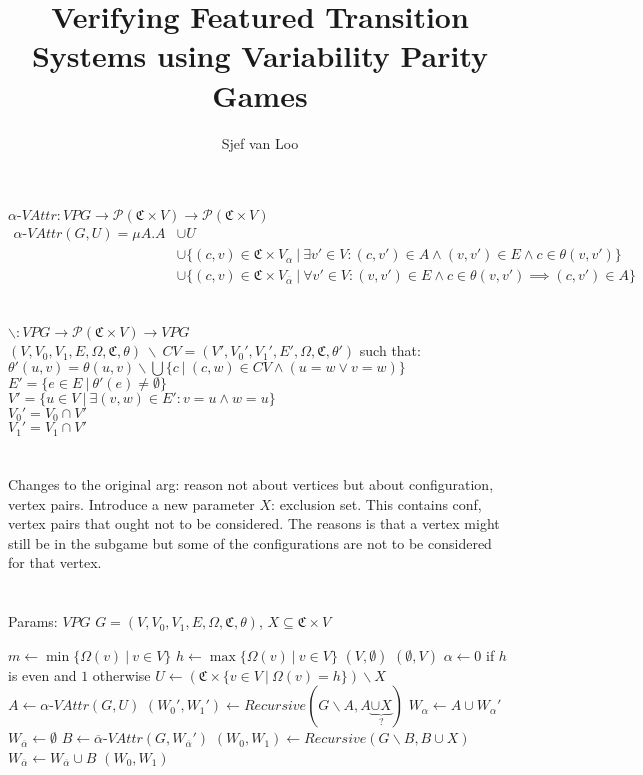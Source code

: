 \documentclass[]{article}
\title{Verifying Featured Transition Systems using Variability Parity Games}
\author{Sjef van Loo}
\begin{document}
$\alpha\textit{-VAttr} : \textit{VPG} \rightarrow \mathcal{P}(\mathfrak{C} \times V) \rightarrow \mathcal{P}(\mathfrak{C} \times V)$\\
\begin{align*}
\alpha\textit{-VAttr}(G, U) = \mu A . A &\cup U \\
& \cup \{(c,v) \in \mathfrak{C} \times V_\alpha\ |\ \exists v' \in V : (c, v') \in A \wedge (v, v') \in E \wedge c \in \theta(v,v') \}\\
& \cup \{(c,v) \in \mathfrak{C} \times V_{\overline{\alpha}}\ |\ \forall v' \in V : (v,v') \in E \wedge c \in \theta(v,v') \implies (c, v') \in A \}
\end{align*}\\\\

$\backslash : \textit{VPG} \rightarrow \mathcal{P}(\mathfrak{C} \times V) \rightarrow \textit{VPG}$\\
$(V, V_0, V_1, E, \Omega, \mathfrak{C}, \theta)\ \backslash\ CV = (V', V_0', V_1', E', \Omega, \mathfrak{C}, \theta')$ such that:\\
$\theta'(u,v) = \theta(u,v) \backslash \bigcup\{c\ |\ (c,w) \in CV \wedge (u = w \vee v = w)\}$\\
$E' = \{e \in E\ |\ \theta'(e) \neq \emptyset \}$\\
$V' = \{u \in V\ |\ \exists (v,w) \in E' : v = u \wedge w = u\}$\\
$V_0' = V_0 \cap V'$\\
$V_1' = V_1 \cap V'$\\\\\\
Changes to the original arg: reason not about vertices but about configuration, vertex pairs. Introduce a new parameter $X$: exclusion set. This contains conf, vertex pairs that ought not to be considered. The reasons is that a vertex might still be in the subgame but some of the configurations are not to be considered for that vertex.\\\\\\
Params: $\textit{VPG } G = (V,V_0,V_1, E, \Omega, \mathfrak{C}, \theta)$, $X \subseteq \mathfrak{C} \times V$
\begin{algorithmic}[1]
	\State $m \gets \min\{ \Omega(v)\ |\ v \in V\}$
	\State $h \gets\max\{ \Omega(v)\ |\ v \in V\}$
			\State \Return $(V,\emptyset)$
		\Else
			\State \Return $(\emptyset, V)$
		\EndIf
	\EndIf
	\State $\alpha \gets 0$ if $h$ is even and $1$ otherwise
	\State $U \gets (\mathfrak{C} \times \{v \in V\ |\ \Omega(v) = h\}) \backslash X$
	\State $A \gets \alpha\textit{-VAttr}(G, U)$
	\State $(W_0', W_1') \gets \textit{Recursive}(G \backslash A ,A \underbrace{ \cup X}_\text{?})$
		\State $W_\alpha \gets A \cup W_\alpha'$
		\State $W_{\overline{\alpha}} \gets \emptyset$
	\Else
		\State $B \gets \overline{\alpha}\textit{-VAttr}(G,W_{\overline{\alpha}}')$
		\State $(W_0, W_1) \gets \textit{Recursive}(G \backslash B,B \cup X)$
		\State $W_{\overline{\alpha}} \gets W_{\overline{\alpha}} \cup B$
	\EndIf
	\State \Return $(W_0, W_1)$
\end{algorithmic}
\end{document}
